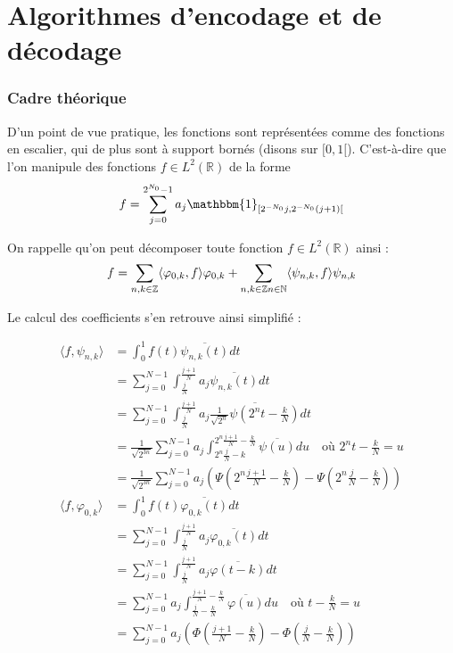 
\newpage

\part{Algorithmes d'encodage et de décodage}

\section{Cadre théorique}

D'un point de vue pratique, les fonctions sont représentées comme des fonctions en escalier, qui de plus sont à support bornés (disons sur $[0, 1[$). C'est-à-dire que l'on manipule des fonctions $f \in L^2(\mathbb{R})$ de la forme $$f = \sum_{j = 0}^{2^{N_0} - 1} a_j \mathbbm{1}_{[2^{-N_0}j, 2^{-N_0}(j+1)[}$$


On rappelle qu'on peut décomposer toute fonction $f \in L^2(\mathbb{R})$ ainsi : $$f = \sum_{n,k \in \mathbb{Z}} \langle \varphi_{0,k}, f \rangle \varphi_{0,k} + \sum_{n,k \in \mathbb{Z} \\ n \in \mathbb{N}} \langle \psi_{n, k}, f \rangle \psi_{n, k}$$

Le calcul des coefficients s'en retrouve ainsi simplifié :

\begin{align*}
	\langle f, \psi_{n, k} \rangle &= \int_0^1 f(t) \overline{\psi_{n, k}(t)} dt \\
	&= \sum_{j=0}^{N-1} \int_{\frac j N}^{\frac{j+1}N} a_j \overline{\psi_{n, k}(t)} dt \\
	&= \sum_{j=0}^{N-1} \int_{\frac j N}^{\frac{j+1}N} a_j \overline{\frac{1}{\sqrt{2^n}} \psi(2^n t - \frac{k}{N})} dt \\
	&= \frac{1}{\sqrt{2^{3n}}} \sum_{j=0}^{N-1} a_j \int_{2^n \frac{j}N - k}^{2^n\frac{j+1}N - \frac{k}{N}} \overline{\psi(u)} du \quad \text{où $2^nt - \frac{k}{N} = u$} \\
	&= \frac{1}{\sqrt{2^{3n}}} \sum_{j=0}^{N-1} a_j \left(\Psi\left(2^n\frac{j+1}N - \frac{k}{N}\right) - \Psi\left(2^n\frac{j}N - \frac{k}{N}\right)\right) \\
	\langle f, \varphi_{0, k} \rangle &= \int_0^1 f(t) \overline{\varphi_{0, k}(t)} dt \\
	&= \sum_{j=0}^{N-1} \int_{\frac j N}^{\frac{j+1}N} a_j \overline{\varphi_{0, k}(t)} dt \\
	&= \sum_{j=0}^{N-1} \int_{\frac j N}^{\frac{j+1}N} a_j \overline{\varphi(t - k)} dt \\
	&= \sum_{j=0}^{N-1} a_j \int_{\frac{j}N - \frac{k}{N}}^{\frac{j+1}N - \frac{k}{N}} \overline{\varphi(u)} du \quad \text{où $t - \frac{k}{N} = u$} \\
	&= \sum_{j=0}^{N-1} a_j \left(\Phi\left(\frac{j+1}N - \frac{k}{N}\right) - \Phi\left(\frac{j}N - \frac{k}{N}\right)\right)
\end{align*}

